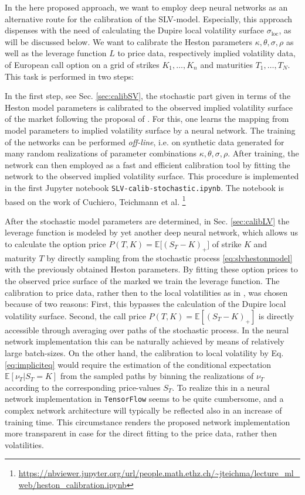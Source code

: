\documentclass[
a4paper,     %
12pt           %
]{scrartcl}  %
\numberwithin{equation}{section}
\begin{document}
In the here proposed approach, we want to employ deep neural networks as an alternative route for the calibration of the SLV-model. Especially, this approach dispenses with the need of calculating the Dupire local volatility surface $\sigma_\text{loc}$, as will be discussed below. We want to calibrate the Heston parameters $\kappa,\theta,\sigma,\rho$ as well as the leverage function $L$ to price data, respectively implied volatility data, of European call option on a grid of strikes $K_1,\dots,K_n$ and maturities $T_1,\dots,T_N$. This task is performed in two steps:

In the first step, see Sec. \ref{sec:calibSV}, the stochastic part given in terms of the Heston model parameters is calibrated to the observed implied volatility surface of the market following the proposal of \cite{horvath_deep_2019}. For this, one learns the mapping from model parameters to implied volatility surface by a neural network. The training of the networks can be performed \textit{off-line}, i.e. on synthetic data generated for many random realizations of parameter combinations $\kappa,\theta,\sigma,\rho$. After training, the network can then employed as a fast and efficient calibration tool by fitting the network to the observed implied volatility surface. This procedure is implemented in the first Jupyter notebook \texttt{SLV-calib-stochastic.ipynb}. The notebook is based on the work of Cuchiero, Teichmann et al. \footnote{\url{https://nbviewer.jupyter.org/url/people.math.ethz.ch/~jteichma/lecture_ml_web/heston_calibration.ipynb}}

After the stochastic model parameters are determined, in Sec. \ref{sec:calibLV} the leverage function is modeled by yet another deep neural network, which allows us to calculate the option price $P(T,K) = \mathbb{E}\big[ (S_T - K)_+ \big]$ of strike $K$ and maturity $T$ by directly sampling from the stochastic process \eqref{eq:slvhestonmodel} with the previously obtained Heston parameters. By fitting these option prices to the observed price surface of the marked we train the leverage function. The calibration to price data, rather then to the local volatilities as in \cite{cozma_calibration_2019,guo_calibration_2019,saporito_calibration_2017}, was chosen because of two reasons: First, this bypasses the calculation of the Dupire local volatility surface. Second, the call price $P(T,K) = \mathbb{E}\left[ ( S_T-K)_+ \right]$ is directly accessible through averaging over paths of the stochastic process. In the neural network implementation this can be naturally achieved by means of relatively large batch-sizes. On the other hand, the calibration to local volatility by Eq. \eqref{eq:impliciteq} would require the estimation of the conditional expectation $\mathbb{E}\left[ \nu_T\big| S_T=K \right]$ from the sampled paths by binning the realizations of $\nu_T$ according to the corresponding price-values $S_T$. To realize this in a neural network implementation in \texttt{TensorFlow} seems to be quite cumbersome, and a complex network architecture will typically be reflected also in an increase of training time. This circumstance renders the proposed network implementation more transparent in case for the direct fitting to the price data, rather then volatilities.
\end{document}
